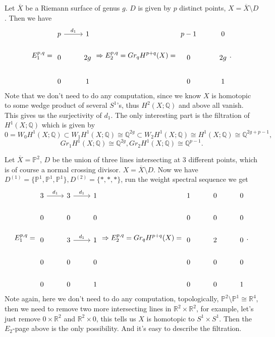 \documentclass[../main.tex]{subfiles}
\begin{document}
\begin{example}
Let $\overline{X}$ be a Riemann surface of genus $g$. $D$ is given by $p$ distinct points, $X=\overline{X}\setminus D$. Then we have 
$$
E_{1}^{p,q}=\begin{tikzcd}p \arrow{r}{d_{1}}& 1\\
0 & 2g\\
0 & 1\end{tikzcd}\Rightarrow E_{2}^{p,q}=Gr_{q}H^{p+q}(X)=\begin{tikzcd}p-1 & 0\\
0 & 2g\\
0 & 1\end{tikzcd}.$$
Note that we don't need to do any computation, since we know $X$ is homotopic to some wedge product of several $S^{1}$'s, thus $H^{2}(X;\mathbb{Q})$ and above all vanish. This gives us the surjectivity of $d_{1}$. The only interesting part is the filtration of $H^{1}(X;\mathbb{Q})$ which is given by 
$$0=W_{0}H^{1}(X;\mathbb{Q})\subset W_{1}H^{1}(X; \mathbb{Q})\cong \mathbb{Q}^{2g}\subset W_{2}H^{1}(X;\mathbb{Q})\cong H^{1}(X;\mathbb{Q})\cong \mathbb{Q}^{2g+p-1},$$
$$Gr_{1}H^{1}(X;\mathbb{Q})\cong \mathbb{Q}^{2g}, Gr_{2}H^{1}(X;\mathbb{Q})\cong \mathbb{Q}^{p-1}.$$
\end{example}
\begin{example}
Let $\overline{X}=\mathbb{P}^{2}$, $D$ be the union of three lines intersecting at $3$ different points, which is of course a normal crossing divisor. $X=\overline{X}\setminus D$. Now we have $D^{(1)}=\{\mathbb{P}^{1},\mathbb{P}^{1},\mathbb{P}^{1}\}, D^{(2)}=\{*, * ,*\}$, run the weight spectral sequence we get  
$$
E_{1}^{p,q}=\begin{tikzcd}
3 \arrow{r}{d_{1}}&3\arrow{r}{d_{1}} & 1\\
0 &0 & 0\\
0 &3 \arrow{r}{d_{1}}& 1\\
0 &0 & 0\\
0 &0 & 1\end{tikzcd}\Rightarrow E_{2}^{p,q}=Gr_{q}H^{p+q}(X)=\begin{tikzcd}
1 &0 & 0\\
0 &0 & 0\\
0 &2 & 0\\
0 &0 & 0\\
0 &0 & 1\end{tikzcd}.$$
Note again, here we don't need to do any computation, topologically, $\mathbb{P}^{2}\setminus\mathbb{P}^{1}\cong \mathbb{R}^{4}$, then we need to remove two more intersecting lines in $\mathbb{R}^{2}\times \mathbb{R}^{2}$, for example, let's just remove $0\times \mathbb{R}^{2}$ and $\mathbb{R}^{2}\times 0$, this tells us $X$ is homotopic to $S^{1}\times S^{1}$. Then the $E_{2}$-page above is the only possibility. And it's easy to describe the filtration.
\end{example}
\end{document}
